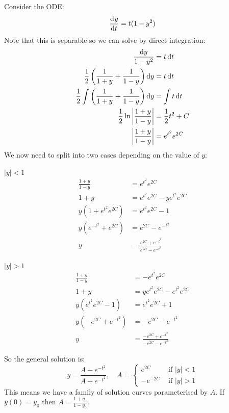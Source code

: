 \documentclass[../main.tex]{subfiles}
\begin{document}
\begin{example}
  Consider the ODE:
  \[
    \deriv{y}{t} = t(1 - y^2)
  \]
  Note that this is separable so we can solve by direct integration:
  \begin{align*}
    \frac{\d{y}}{1 - y^2} &= t \d{t} \\
    \frac{1}{2}\left(\frac{1}{1+y} + \frac{1}{1-y}\right)\d{y} &= t\d{t} \\
    \frac{1}{2} \int \left(\frac{1}{1+y} + \frac{1}{1-y}\right) \d{y} &= \int t \d{t} \\
    \frac{1}{2}\ln \abs{\frac{1 + y}{1-y}} &= \frac{1}{2}t^2 + C \\
    \abs{\frac{1 + y}{1 - y}} &= e^{t^2} e^{2C}
  \end{align*}
  We now need to split into two cases depending on the value of $y$:
  \begin{proofcases}
    \begin{case}{$|y| < 1$}
      \vspace{-2em}
      \begin{align*}
        \frac{1 + y}{1 - y} &= e^{t^2} e^{2C} \\
        1 + y &= e^{t^2} e^{2C} - ye^{t^2} e^{2C} \\
        y(1 + e^{t^2}e^{2C}) &= e^{t^2} e^{2C} - 1 \\
        y(e^{-t^2} + e^{2C}) &= e^{2C} - e^{-t^2} \\
        y &= \frac{e^{2C} + e^{-t^2}}{e^{2C} - e^{-t^2}}
      \end{align*}
    \end{case}
    \begin{case}{$|y| > 1$}
      \vspace{-2em}
      \begin{align*}
        \frac{1 + y}{1 - y} &= - e^{t^2} e^{2C} \\
        1 + y &= ye^{t^2} e^{2C} - e^{t^2}e^{2C} \\
        y(e^{t^2}e^{2C} - 1) &= e^{t^2} e^{2C} + 1 \\
        y(-e^{2C} + e^{-t^2}) &= -e^{2C} - e^{-t^2} \\
        y &= \frac{-e^{2C} + e^{-t^2}}{-e^{2C} - e^{-t^2}}
      \end{align*}
    \end{case}
  \end{proofcases}
  So the general solution is:
  \[
    y = \frac{A - e^{-t^2}}{A + e^{-t^2}},\quad A = \begin{cases}
    e^{2C} & \text{ if } |y| < 1 \\
    -e^{-2C} & \text{ if } |y| > 1
    \end{cases}
  \]
  This means we have a family of solution curves parameterised by $A$.
  If $y(0) = y_0$ then $A = \frac{1 + y_0}{1 - y_0}$.
  \begin{center}
\end{center}
\end{example}
\end{document}

